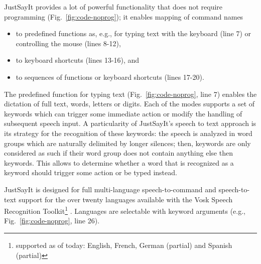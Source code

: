 \documentclass{juliacon}
\begin{document}
JustSayIt provides a lot of powerful functionality that does not require programming (Fig.~\ref{fig:code-noprog}); it enables mapping of command names 
\begin{itemize}
\item to predefined functions as, e.g., for typing text with the keyboard (line 7) or controlling the mouse (lines 8-12),
\item to keyboard shortcuts (lines 13-16), and
\item to sequences of functions or keyboard shortcuts (lines 17-20).
\end{itemize}
The predefined function for typing text (Fig.~\ref{fig:code-noprog}, line 7) enables the dictation of full text, words, letters or digits. Each of the modes supports a set of keywords which can trigger some immediate action or modify the handling of subsequent speech input. A particularity of JustSayIt’s speech to text approach is its strategy for the recognition of these keywords: the speech is analyzed in word groups which are naturally delimited by longer silences; then, keywords are only considered as such if their word group does not contain anything else then keywords. This allows to determine whether a word that is recognized as a keyword should trigger some action or be typed instead.

JustSayIt is designed for full multi-language speech-to-command and speech-to-text support for the over twenty languages available with the Vosk Speech Recognition Toolkit\footnote{supported as of today: English, French, German (partial) and Spanish (partial)} \cite{vosk}.  Languages are selectable with keyword arguments (e.g., Fig.~\ref{fig:code-noprog}, line 26).
\end{document}
